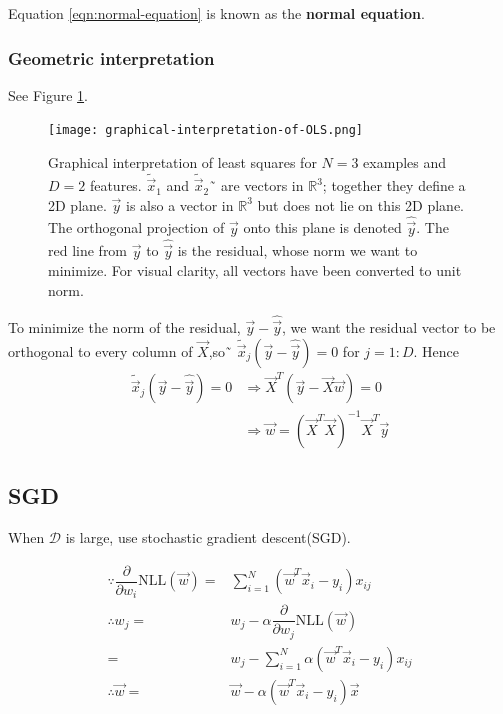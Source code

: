 Equation \ref{eqn:normal-equation} is known as the \textbf{normal equation}.


\subsubsection{Geometric interpretation}

See Figure \ref{fig:graphical-interpretation-of-OLS}.
\begin{figure}[hbtp]
\centering
    \texttt{[image: graphical-interpretation-of-OLS.png]}
\caption{Graphical interpretation of least squares for $N=3$ examples and $D=2$ features. $\tilde{\vec{x}}_1$ and $\tilde{\vec{x}}_2$˜ are vectors in $\mathbb{R}^3$; together they define a 2D plane. $\vec{y}$ is also a vector in $\mathbb{R}^3$ but does not lie on this 2D plane. The orthogonal projection of $\vec{y}$ onto this plane is denoted $\hat{\vec{y}}$. The red line from $\vec{y}$ to $\hat{\vec{y}}$ is the residual, whose norm we want to minimize. For visual clarity, all vectors have been converted to unit norm.}
\label{fig:graphical-interpretation-of-OLS} 
\end{figure}

To minimize the norm of the residual, $\vec{y}-\hat{\vec{y}}$, we want the residual vector to be orthogonal to every column of $\vec{X}$,so˜ $\tilde{\vec{x}}_j(\vec{y}-\hat{\vec{y}})=0$ for $j=1:D$. Hence
\begin{equation}\begin{split}
\tilde{\vec{x}}_j(\vec{y}-\hat{\vec{y}})=0 & \Rightarrow \vec{X}^T(\vec{y}-\vec{X}\vec{w})=0 \\
                                           & \Rightarrow \vec{w}=(\vec{X}^T\vec{X})^{-1}\vec{X}^T\vec{y}
\end{split}\end{equation}


\subsection{SGD}
When $\mathcal{D}$ is large, use stochastic gradient descent(SGD).

\begin{align}
\because \dfrac{\partial}{\partial w_i}\text{NLL}(\vec{w})=& \sum\limits_{i=1}^N (\vec{w}^T\vec{x}_i-y_i)x_{ij} \\
\therefore w_j=& w_j - \alpha\dfrac{\partial}{\partial w_j}\text{NLL}(\vec{w}) \nonumber \\
                  =& w_j - \sum\limits_{i=1}^N \alpha(\vec{w}^T\vec{x}_i-y_i)x_{ij} \\
\therefore \vec{w}=& \vec{w}-\alpha(\vec{w}^T\vec{x}_i-y_i)\vec{x}
\end{align}


